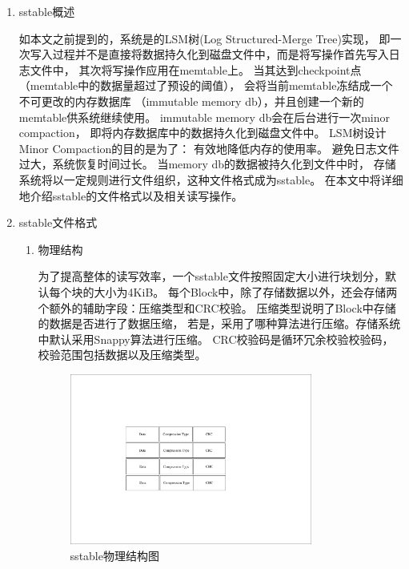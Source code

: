 			\begin{enumerate}
				\item sstable概述
				
				如本文之前提到的，系统是的LSM树(Log Structured-Merge Tree)实现，
				即一次写入过程并不是直接将数据持久化到磁盘文件中，而是将写操作首先写入日志文件中，
				其次将写操作应用在memtable上。
				当其达到checkpoint点（memtable中的数据量超过了预设的阈值），
				会将当前memtable冻结成一个不可更改的内存数据库
				（immutable memory db），并且创建一个新的memtable供系统继续使用。
				immutable memory db会在后台进行一次minor compaction，
				即将内存数据库中的数据持久化到磁盘文件中。
				LSM树设计Minor Compaction的目的是为了：
				有效地降低内存的使用率。
				避免日志文件过大，系统恢复时间过长。
				当memory db的数据被持久化到文件中时，
				存储系统将以一定规则进行文件组织，这种文件格式成为sstable。
				在本文中将详细地介绍sstable的文件格式以及相关读写操作。

				\item sstable文件格式
				

				\begin{enumerate}
					\item 物理结构

					为了提高整体的读写效率，一个sstable文件按照固定大小进行块划分，默认每个块的大小为4KiB。
					每个Block中，除了存储数据以外，还会存储两个额外的辅助字段：压缩类型和CRC校验。
					压缩类型说明了Block中存储的数据是否进行了数据压缩，
					若是，采用了哪种算法进行压缩。存储系统中默认采用Snappy算法进行压缩。
					CRC校验码是循环冗余校验校验码，校验范围包括数据以及压缩类型。
					
					\begin{figure}[H]
						\centering
						\includegraphics[width=0.80\textwidth]{pdf/sstable_physic.pdf}
						\caption{sstable物理结构图}
						\label{sstable_physic}
					\end{figure}
					

\end{enumerate}
\end{enumerate}
